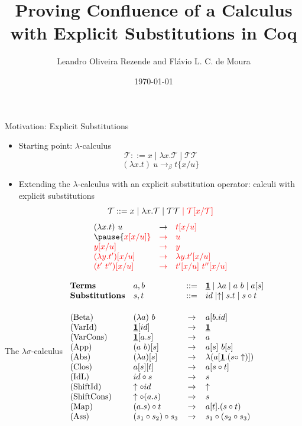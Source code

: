 \documentclass[10pt]{beamer}
\title{Proving Confluence of a Calculus with Explicit Substitutions in Coq}
\date{\today}
\author{Leandro Oliveira Rezende and Flávio L. C. de Moura}
\institute{WPOS 2018}
\newcommand{\term}{{\mathcal{T}}}
\newcommand{\db}[1]{{\bf \underline{#1}}}
\begin{document}
\maketitle

\begin{frame}[fragile]{Motivation: Explicit Substitutions}
  \begin{itemize}
  \item Starting point: $\lambda$-calculus
    $$\term ::= x \mid \lambda x.\term \mid \term\term $$
    $$(\lambda x.t)\ u \to_\beta t\{x/u\}$$
    \pause
    \item Extending the $\lambda$-calculus with an explicit substitution operator: {\color{red} calculi with explicit substitutions} 
    $$\term ::= x \mid \lambda x.\term \mid \term\term\; {\color{red} \mid \term[x/\term]}$$ \pause
    $$\begin{array}{lll}
        (\lambda x.t)\ u &  \to &  {\color{red} t[x/u]} \\ \pause
        {\color{red} x[x/u]} & {\color{red}\to} & {\color{red}u} \\
        {\color{red} y[x/u]} & {\color{red}\to} & {\color{red}y} \\
        {\color{red}(\lambda y.t')[x/u]} &  {\color{red} \to} &  {\color{red} \lambda y. t'[x/u]} \\
        {\color{red} (t'\ t'')[x/u]} & {\color{red}\to} & {\color{red} t'[x/u]\ t''[x/u]} \\
      \end{array}$$
  \end{itemize}
\end{frame}

\begin{frame}{The $\lambda\sigma$-calculus}
  $\begin{array}{llcl}
      \mbox{\bf Terms} &  a,b & ::=  & \db{1} \mid \lambda a \mid a\ b \mid a[s]  \\ 
     \mbox{\bf Substitutions} & s,t & ::= & id \mid \uparrow \mid s.t \mid s \circ t \\[.5cm]
     \mbox{(Beta)} & (\lambda a)\ b & \to &  a[b.id] \\
     \mbox{(VarId)} & \db{1}[id] & \to & \db{1} \\
     \mbox{(VarCons)} & \db{1}[a.s] & \to & a \\
     \mbox{(App)} & (a\ b)[s] & \to &  a[s]\ b[s] \\
     \mbox{(Abs)} & (\lambda a)[s] & \to &  \lambda(a[\db{1}.(s \circ \uparrow)]) \\
     \mbox{(Clos)} & a[s][t] & \to &  a[s\circ t] \\     
     \mbox{(IdL)} & id\circ s & \to & s \\
     \mbox{(ShiftId)} & \uparrow \circ id & \to & \uparrow \\
     \mbox{(ShiftCons)} & \uparrow \circ (a.s) & \to & s \\
     \mbox{(Map)} & (a.s) \circ t & \to & a[t].(s \circ t) \\
     \mbox{(Ass)} & (s_1 \circ s_2) \circ s_3 & \to & s_1 \circ (s_2 \circ s_3)
    \end{array}$
  \end{frame}
\end{document}
